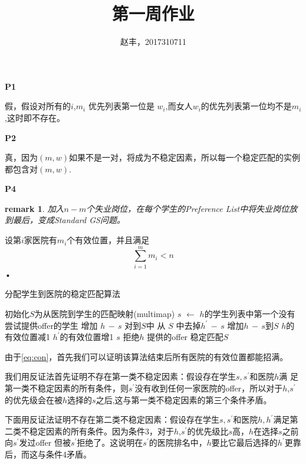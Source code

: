 \documentclass{article}
\newtheorem{remark}{remark}
\begin{document}
\title{第一周作业}
\author{赵丰，2017310711}
\maketitle
\textbf{P1}

假，假设对所有的$i$,$m_i$ 优先列表第一位是 $w_i$,而女人$w_i$的优先列表第一位均不是$m_i$,这时即不存在。

\textbf{P2}

真，因为$(m,w)$如果不是一对，将成为不稳定因素，所以每一个稳定匹配的实例都包含对$(m,w)$.

\textbf{P4}

\begin{remark}
加入$n-m$个失业岗位，在每个学生的Preference List中将失业岗位放到最后，变成Standard GS问题。
\end{remark}

设第$i$家医院有$m_i$个有效位置，并且满足
\begin{equation}\label{eq:con}
\sum_{i=1}^m m_i < n
\end{equation}•
\begin{algorithm}
\caption{分配学生到医院的稳定匹配算法}
\begin{algorithmic}[1]
\STATE 初始化$S$为从医院到学生的匹配映射(multimap)
\STATE $s$ $\leftarrow$ $h$的学生列表中第一个没有尝试提供offer的学生
\STATE 增加 $h \,-\,s$ 对到$S$中 
\STATE 从 $S$ 中去掉$h^{\prime}\,-\,s$
\STATE 增加$h\,-\,s$到$S$
\STATE $h$的有效位置减1
\STATE $h^{\prime}$的有效位置增1
\ELSE
\STATE $s$ 拒绝$h$ 提供的offer
\ENDIF
\ENDFOR
\ENDWHILE
\RETURN 稳定匹配$S$
\end{algorithmic}
\end{algorithm}
由于\eqref{eq:con}，首先我们可以证明该算法结束后所有医院的有效位置都能招满。

我们用反证法首先证明不存在第一类不稳定因素：假设存在学生$s,s^{\prime}$和医院$h$满
足第一类不稳定因素的所有条件，则$s^{\prime}$没有收到任何一家医院的offer，所以对于$h$,$s^{\prime}$的优先级会在被$h$选择的$s$之后,这与第一类不稳定因素的第三个条件矛盾。

下面用反证法证明不存在第二类不稳定因素：假设存在学生$s,s^{\prime}$和医院$h,h^{\prime}$满足第二类不稳定因素的所有条件。因为条件3，对于$h$,$s^{\prime}$的优先级比$s$高，$h$在选择$s$之前向$s^{\prime}$发过offer 但被$s^{\prime}$拒绝了。这说明在$s^{\prime}$的医院排名中，$h$要比它最后选择的$h^{\prime}$更靠后，而这与条件4矛盾。
\end{document}
